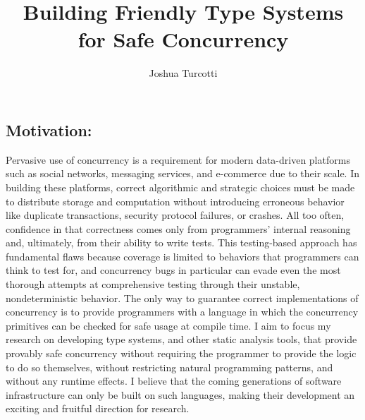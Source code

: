 \documentclass{nsf-grfp}
\title{Building Friendly Type Systems for Safe Concurrency}
\author{Joshua Turcotti}
\begin{document}
\maketitle

\subsection*{Motivation:} Pervasive use of concurrency is a requirement for modern data-driven platforms such as social networks, messaging services, and e-commerce due to their scale. In building these platforms, correct algorithmic and strategic choices must be made to distribute storage and computation without introducing erroneous behavior like duplicate transactions, security protocol failures, or crashes. All too often, confidence in that correctness comes only from programmers' internal reasoning and, ultimately, from their ability to write tests. This testing-based approach has fundamental flaws because coverage is limited to behaviors that programmers can think to test for, and concurrency bugs in particular can evade even the most thorough attempts at comprehensive testing through their unstable, nondeterministic behavior. The only way to guarantee correct implementations of concurrency is to provide programmers with a language in which the concurrency primitives can be checked for safe usage at compile time. I aim to focus my research on developing type systems, and other static analysis tools, that provide provably safe concurrency without requiring the programmer to provide the logic to do so themselves, without restricting natural programming patterns, and without any runtime effects. I believe that the coming generations of software infrastructure can only be built on such languages, making their development an exciting and fruitful direction for research.
\end{document}
